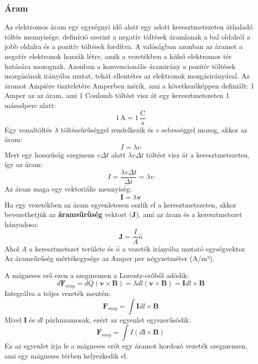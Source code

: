 \documentclass[../main.tex]{subfiles}
\begin{document}
\subsubsection{Áram}
Az elektromos áram egy egységnyi idő alatt egy adott keresztmetszeten áthaladó töltés mennyisége. definíció szerint a negatív töltések áramlanak a bal oldalról a jobb oldalra és a pozitív töltések fordítva.
A valóságban azonban az áramot a negatív elektronok hozzák létre, amik a vezetékben a külső elektromos tér hatására mozognak. Azonban a konvencionális áramirány a pozitív töltések mozgásának irányába mutat,
tehát ellentétes az elektronok mozgásirányával. Az áramot Ampiére tiszteletére Amperben mérik, ami a következőképpen definiált: 1 Amper az az áram, ami 1 Coulomb töltést visz át egy keresztmetszeten 1 másodperc alatt:
\begin{equation}
    1 \, \text{A} = 1 \, \frac{\text{C}}{\text{s}}
\end{equation}
Egy vonaltöltés $\lambda$ töltéssűrűséggel rendelkezik és $v$ sebességgel mozog, akkor az áram:
\begin{equation}
    I = \lambda v
\end{equation}
Mert egy hosszúság szegmens $v\Delta t$ alatt $\lambda v \Delta t$ töltést visz át a keresztmetszeten, így az áram:
\begin{equation}
    I = \frac{\lambda v \Delta t}{\Delta t} = \lambda v
\end{equation}
Az áram maga egy vektoriális mennyiség:
\begin{equation}
    \mathbf{I} = \lambda \mathbf{v}
\end{equation}
Ha egy vezetékben az áram egyenletesen oszlik el a keresztmetszeten, akkor bevezethetjük az \textbf{áramsűrűség} vektort ($\mathbf{J}$), ami az áram és a keresztmetszet hányadosa:
\begin{equation}
    \mathbf{J} = \frac{I}{A} \hat{n}
\end{equation}
Ahol $A$ a keresztmetszet területe és $\hat{n}$ a vezeték irányába mutató egységvektor. Az áramsűrűség mértékegysége az Amper per négyzetméter (A/m²).

A mágneses erő ezen a szegmensen a Lorentz-erőből adódik:
\begin{equation}
    d\mathbf{F}_{mag} = dQ (\mathbf{v} \times \mathbf{B}) = \lambda dl (\mathbf{v} \times \mathbf{B}) = \mathbf{I} dl \times \mathbf{B}
\end{equation}
Integrálva a teljes vezeték mentén:
\begin{equation}
    \mathbf{F}_{mag} = \int \mathbf{I} dl \times \mathbf{B}
\end{equation}
Mivel $\mathbf{I}$ és $dl$ párhuzamosak, ezért az egyenlet egyszerűsödik:
\begin{equation}
   \boxed{\mathbf{F}_{mag} = \int I (d\mathbf{l} \times \mathbf{B})}
\end{equation}
Ez az egyenlet írja le a mágneses erőt egy áramot hordozó vezeték szegmensen, ami egy mágneses térben helyezkedik el.
\end{document}
